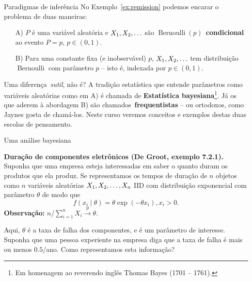 \begin{frame}{Paradigmas de inferência}
No Exemplo~\ref{ex:remission} podemos encarar o problema de duas maneiras:
\begin{itemize}
 \item[A)] $P$ é uma variável aleatória e $X_1, X_2, \ldots$ são $\operatorname{Bernoulli}(p)$~\textbf{condicional} ao evento $P = p$, $p \in (0, 1)$.
 \item[B)] Para uma constante fixa (e inobservável) $p$, $X_1, X_2, \ldots$ tem distribuição $\operatorname{Bernoulli}$ com parâmetro $p$ -- isto é, indexada por $p \in (0, 1)$.
\end{itemize}
Uma diferença~\textit{sutil}, não é?
A tradição estatística que entende parâmetros como variáveis aleatórias como em A) é chamada de \textbf{Estatística bayesiana}\footnote{Em homenagem ao reverendo inglês Thomas Bayes (1701 -- 1761).}.
Já os que aderem à abordagem B) são chamados~\textbf{frequentistas} -- ou ortodoxos, como Jaynes gosta de chamá-los.
Neste curso veremos conceitos e exemplos destas duas escolas de pensamento. 
\end{frame}
\begin{frame}{Uma análise bayesiana}
\begin{exemplo}
\label{ex:duracao_componentes}
\textbf{Duração de componentes eletrônicos (De Groot, exemplo 7.2.1).}
Suponha que uma empresa esteja interessadas em saber o quanto duram os produtos que ela produz.
Se representamos os tempos de duração de $n$ objetos como $n$ variáveis aleatórias $X_1, X_2, \ldots, X_n$ IID com distribuição exponencial com parâmetro $\theta$ de modo que
$$f(x_i \mid \theta) = \theta \exp(-\theta x_i), x_i > 0.$$
\textbf{Observação:} $n/\sum_{i=1}^n X_i \xrightarrow{\text{p}} \theta$.

Aqui, $\theta$ é a taxa de falha dos componentes, e é um parâmetro de interesse.
Suponha que uma pessoa experiente na empresa diga que a taxa de falha é mais ou menos $0.5$/ano.
Como representamos esta informação?
\end{exemplo} 
\end{frame}
